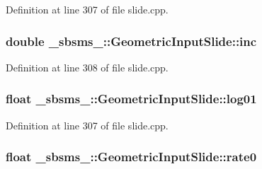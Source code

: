 Definition at line 307 of file slide.\+cpp.

\subsubsection[{\texorpdfstring{inc}{inc}}]{\setlength{\rightskip}{0pt plus 5cm}double \+\_\+sbsms\+\_\+\+::\+Geometric\+Input\+Slide\+::inc\hspace{0.3cm}{\ttfamily [protected]}}\hypertarget{class__sbsms___1_1_geometric_input_slide_a25eb2371f4506e775684869444a31ba4}{}\label{class__sbsms___1_1_geometric_input_slide_a25eb2371f4506e775684869444a31ba4}


Definition at line 308 of file slide.\+cpp.

\subsubsection[{\texorpdfstring{log01}{log01}}]{\setlength{\rightskip}{0pt plus 5cm}float \+\_\+sbsms\+\_\+\+::\+Geometric\+Input\+Slide\+::log01\hspace{0.3cm}{\ttfamily [protected]}}\hypertarget{class__sbsms___1_1_geometric_input_slide_aad7d3340ba257f90cfe740bba066d9c3}{}\label{class__sbsms___1_1_geometric_input_slide_aad7d3340ba257f90cfe740bba066d9c3}


Definition at line 307 of file slide.\+cpp.

\subsubsection[{\texorpdfstring{rate0}{rate0}}]{\setlength{\rightskip}{0pt plus 5cm}float \+\_\+sbsms\+\_\+\+::\+Geometric\+Input\+Slide\+::rate0\hspace{0.3cm}{\ttfamily [protected]}}\hypertarget{class__sbsms___1_1_geometric_input_slide_aaa8047cc4f1d52ff660065807225ef74}{}\label{class__sbsms___1_1_geometric_input_slide_aaa8047cc4f1d52ff660065807225ef74}


